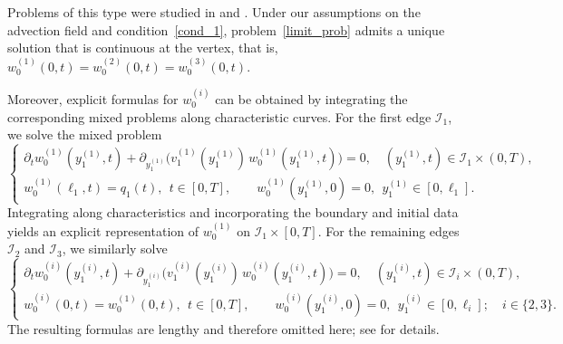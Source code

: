 \documentclass[reqno]{amsart}            %
\numberwithin{equation}{section}
\begin{document}
	Problems of this type were studied in \cite[Sect.~3]{Mel-Roh_AA-2024} and 
	\cite[\S 3.3]{Mel-Roh_JMAA-2024}.  
	Under our assumptions on the advection field and condition~\eqref{cond_1}, 
	problem~\eqref{limit_prob} admits a unique solution that is continuous at the vertex,
	that is, $w_0^{(1)}(0, t)=w_0^{(2)}(0, t)=w_0^{(3)}(0, t).$ 
	
	Moreover, explicit formulas for $w^{(i)}_0$ can be obtained by integrating the 
	corresponding mixed problems along characteristic curves.
	For the first edge $\mathcal{I}_1$, we solve the mixed problem
	\begin{equation}\label{limit_prob-1a}
		\left\{
		\begin{array}{l}
			\partial_t w^{(1)}_0(y_1^{(1)},t)
			+ \partial_{y_1^{(1)}}\!\big(v_1^{(1)}(y_1^{(1)})\, w^{(1)}_0(y_1^{(1)},t)\big)
			= 0,
			\quad (y_1^{(1)},t)\in\mathcal{I}_1\times(0,T),
			\\[2mm]
			w^{(1)}_0(\ell_1,t)=q_1(t), \ \ t \in [0,T], \qquad
			w^{(1)}_0(y_1^{(1)},0)=0,\ \ y_1^{(1)}\in[0,\ell_1].
		\end{array}
		\right.
	\end{equation}
	Integrating along characteristics and incorporating the boundary and initial data 
	yields an explicit representation of $w^{(1)}_0$ on $\mathcal{I}_1\times[0,T]$.
	For the remaining edges $\mathcal{I}_2$ and $\mathcal{I}_3$, we similarly solve
	\begin{equation}\label{limit_prob-1b}
		\left\{
		\begin{array}{l}
			\partial_t w^{(i)}_0(y_1^{(i)},t)
			+ \partial_{y_1^{(i)}}\!\big(v_1^{(i)}(y_1^{(i)})\, w^{(i)}_0(y_1^{(i)},t)\big)
			= 0,
			\quad (y_1^{(i)},t)\in\mathcal{I}_i\times(0,T),
			\\[2mm]
			w^{(i)}_0(0,t)=w^{(1)}_0(0,t), \ \ t \in [0,T],\qquad
			w^{(i)}_0(y_1^{(i)},0)=0,\ \ y_1^{(i)}\in[0,\ell_i]; \quad i \in\{2,3\}.
		\end{array}
		\right.
	\end{equation}
	The resulting formulas are lengthy and therefore omitted here; see \cite[Sect.~3]{Mel-Roh_AA-2024} for details.
	
\end{document}

